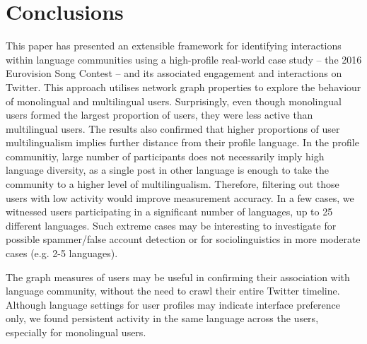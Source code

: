 \documentclass{llncs}
\begin{document}
\section{Conclusions}\label{conclusions}

This paper has presented an extensible framework for identifying
interactions within language communities using a high-profile
real-world case study -- the 2016 Eurovision Song Contest -- and its
associated engagement and interactions on Twitter. This approach
utilises network graph properties to explore the behaviour of
monolingual and multilingual users. Surprisingly, even though
monolingual users formed the largest proportion of users, they were
less active than multilingual users.  The results also confirmed that
higher proportions of user multilingualism implies further distance
from their profile language.  In the profile communitiy, large number
of participants does not necessarily imply high language diversity, as
a single post in other language is enough to take the community to a
higher level of multilingualism.  Therefore, filtering out those users
with low activity would improve measurement accuracy. In a few cases,
we witnessed users participating in a significant number of languages,
up to 25 different languages. Such extreme cases may be interesting to
investigate for possible spammer/false account detection or for
sociolinguistics in more moderate cases (e.g. 2-5 languages).

The graph measures of users may be useful in confirming their
association with language community, without the need to crawl their
entire Twitter timeline.  Although language settings for user profiles
may indicate interface preference only, we found persistent activity
in the same language across the users, especially for monolingual
users.


\end{document}
